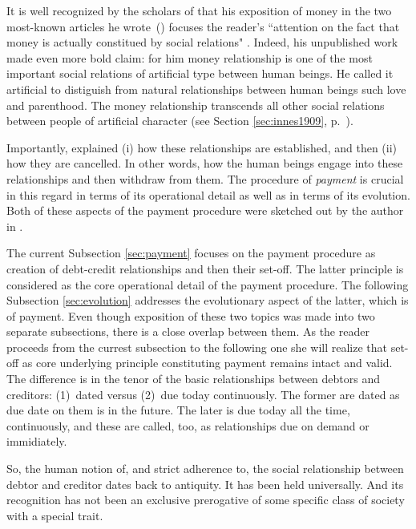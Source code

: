 It is well recognized by the scholars of \citeauthor{innes1913} that his exposition of money in the two most-known articles he wrote~(\citeyear{innes1913,innes1914}) focuses the reader's ``attention on the fact that money is actually constitued by social relations" \citep[p.~185]{ingham2004}. Indeed, his unpublished work made even more bold claim: for him money relationship is one of the most important social relations of artificial type between human beings. He called it artificial to distiguish from natural relationships between human beings such love and parenthood. The money relationship transcends all other social relations between people of artificial character (see Section \ref{sec:innes1909}, p.~\pageref{debt_credit_relation}).

Importantly, \citeauthor{innes1913} explained (i) how these relationships are established, and then (ii) how they are cancelled. In other words, how the human beings engage into these relationships and then withdraw from them. The procedure of \textit{payment} is crucial in this regard in terms of its operational detail as well as in terms of its evolution. Both of these aspects of the payment procedure were sketched out by the author in \citep{innes1913,innes1914}. 

The current Subsection \ref{sec:payment} focuses on the payment procedure as creation of debt-credit relationships and then their set-off. The latter principle is considered as the core operational detail of the payment procedure. The following Subsection \ref{sec:evolution} addresses the evolutionary aspect of the latter, which is of payment. Even though exposition of these two topics was made into two separate subsections, there is a close overlap between them. As the reader proceeds from the currest subsection to the following one she will realize that set-off as core underlying principle constituting payment remains intact and valid. The difference is in the tenor of the basic relationships between debtors and creditors: (1)~dated versus (2)~due today continuously. The former are dated as due date on them is in the future. The later is due today all the time, continuously, and these are called, too, as relationships due on demand or immidiately.

So, the human notion of, and strict adherence to, the social relationship between debtor and creditor dates back to antiquity. It has been held universally. And its recognition has not been an exclusive prerogative of some specific class of society with a special trait. 

